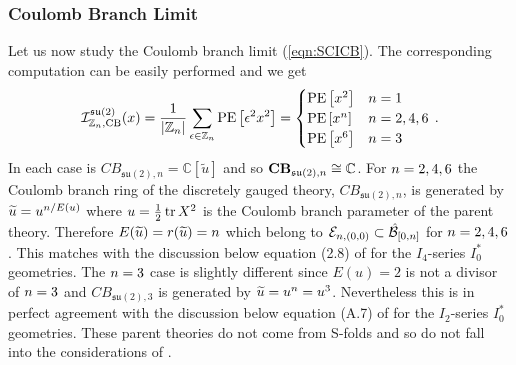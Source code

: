 \documentclass[main.tex]{subfiles}
\begin{document}
\subsubsection{Coulomb Branch Limit}
Let us now study the Coulomb branch limit (\ref{eqn:SCICB}). The corresponding computation can be easily performed and we get
\begin{equation}
\mathcal{I}_{\mathbb{Z}_{n},\text{CB}}^{\mathfrak{su}(2)}(x)=\frac{1}{|\mathbb{Z}_{n}|}\sum_{\epsilon\in\mathbb{Z}_{n}}\operatorname{\mathrm{PE}}\left[\epsilon^2x^2\right]=\begin{cases}\operatorname{\mathrm{PE}}\left[x^2\right]&{n}=1\\
\operatorname{\mathrm{PE}}\left[x^{n}\right]&{n}=2,4,6\\
\operatorname{\mathrm{PE}}\left[x^6\right]&{n}=3\\\end{cases}\,.
\end{equation}
In each case is $CB_{\mathfrak{su}(2),n}=\mathbb{C}\left[\widetilde{u}\right]$ and so $\mathbf{CB}_{\mathfrak{su}(2),n}\cong\mathbb{C}$. For ${n}=2,4,6$ the Coulomb branch ring of the discretely gauged theory, $CB_{\mathfrak{su}(2),n}$, is generated by $\widetilde{u}=u^{{n}/E(u)}$ where $u=\frac{1}{2}\operatorname{tr} X^2$ is the Coulomb branch parameter of the parent theory. Therefore $E(\widetilde{u})=r(\widetilde{u})={n}$ which belong to $\mathcal{E}_{{n},(0,0)}\subset\hat{\mathcal{B}}_{[0,{n}]}$ for ${n}=2,4,6$. This matches with the discussion below equation (2.8) of \cite{Argyres:2016yzz} for the $I_4$-series $I_0^*$ geometries. The ${n}=3$ case is slightly different since $E(u)=2$ is not a divisor of ${n}=3$ and $CB_{\mathfrak{su}(2),3}$ is generated by $\widetilde{u}=u^{n}=u^3$. Nevertheless this is in perfect agreement with the discussion below equation (A.7) of \cite{Argyres:2016yzz} for the $I_2$-series $I_0^*$ geometries. These parent theories do not come from S-folds and so do not fall into the considerations of \cite{Aharony:2016kai}.
\end{document}
